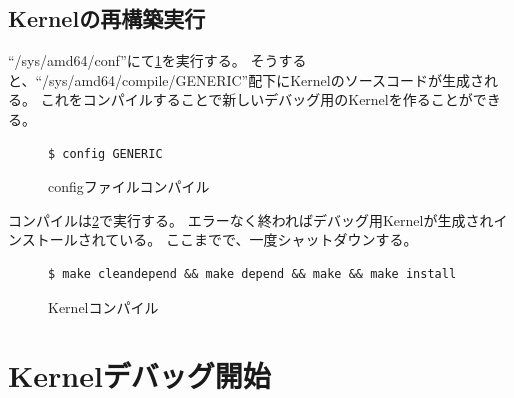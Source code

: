 \documentclass[a4j]{jarticle}
\begin{document}
\begin{multicols}{2}
\subsection{Kernelの再構築実行}
\label{sec:Kern_build}
``/sys/amd64/conf''にて\ref{fig:FreeBSD_cf}を実行する。
そうすると、``/sys/amd64/compile/GENERIC''配下にKernelのソースコードが生成される。
これをコンパイルすることで新しいデバッグ用のKernelを作ることができる。
\begin{figure}[htbp]
	\begin{center}
		\begin{lstlisting}[basicstyle=\ttfamily\footnotesize, frame=single, breaklines=true]
$ config GENERIC
		\end{lstlisting}
	\end{center}
	\caption{configファイルコンパイル}
	\label{fig:FreeBSD_cf}
\end{figure}

コンパイルは\ref{fig:FreeBSD_kern}で実行する。
エラーなく終わればデバッグ用Kernelが生成されインストールされている。
ここまでで、一度シャットダウンする。
\begin{figure}[htbp]
	\begin{center}
		\begin{lstlisting}[basicstyle=\ttfamily\footnotesize, frame=single, breaklines=true]
$ make cleandepend && make depend && make && make install
		\end{lstlisting}
	\end{center}
	\caption{Kernelコンパイル}
	\label{fig:FreeBSD_kern}
\end{figure}

\section{Kernelデバッグ開始}

\newpage
\end{multicols}
\end{document}
